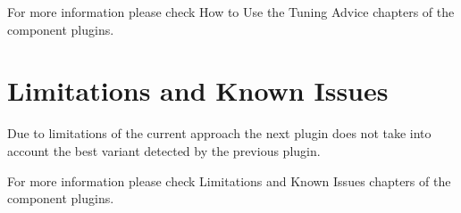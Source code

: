 \documentclass[11pt,a4paper, oneside]{book} %
\begin{document}
For more information please check How to Use the Tuning Advice chapters of the component plugins.

\chapter{Limitations and Known Issues}

Due to limitations of the current approach the next plugin does not take into account the best variant detected by the previous plugin.

For more information please check Limitations and Known Issues chapters of the component plugins.
\end{document}
